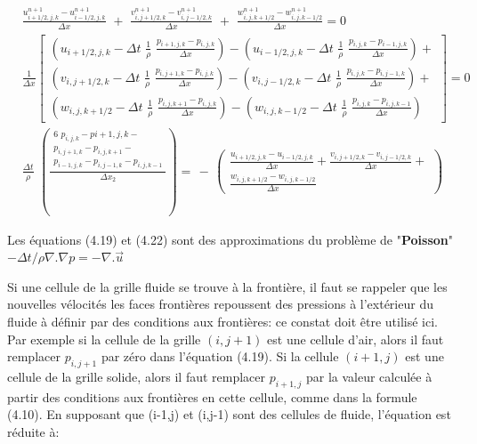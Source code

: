 \documentclass[11pt]{report}
\begin{document}
\begin{eqnarray}
& \frac{u_{i+1/2,j,k}^{n+1} - u_{i-1/2,j,k}^{n+1}}{\Delta x} \,\,+\,\, \frac{v_{i,j+1/2,k}^{n+1} - v_{i,j-1/2,k}^{n+1}}{\Delta x} \,\,+\,\,
\frac{w_{i,j,k+1/2}^{n+1} - w_{i,j,k-1/2}^{n+1}}{\Delta x} =  0 \\ 
& \frac{1}{\Delta x} 
	\left[
		\begin{array}{c}
			\left( 
			u_{i+1/2,j,k} - \Delta t \,\, \frac{1}{\rho} \,\, \frac{p_{i+1,j,k} - p_{i,j,k}}{\Delta x}
			\right) -
			\left( 
			u_{i-1/2,j,k} - \Delta t \,\, \frac{1}{\rho} \,\, \frac{p_{i,j,k} - p_{i-1,j,k}}{\Delta x}
			\right) +\\
			\left( 
			v_{i,j+1/2,k} - \Delta t \,\, \frac{1}{\rho} \,\, \frac{p_{i,j+1,k} - p_{i,j,k}}{\Delta x}
			\right) -
			\left( 
			v_{i,j-1/2,k} - \Delta t \,\, \frac{1}{\rho} \,\, \frac{p_{i,j,k} - p_{i,j-1,k}}{\Delta x}
			\right)+\\
			\left( 
			w_{i,j,k+1/2} - \Delta t \,\, \frac{1}{\rho} \,\, \frac{p_{i,j,k+1} - p_{i,j,k}}{\Delta x}
			\right) -
			\left( 
			w_{i,j,k-1/2} - \Delta t \,\, \frac{1}{\rho} \,\, \frac{p_{i,j,k} - p_{i,j,k-1}}{\Delta x}
			\right)
		\end{array}
	 \right] =  0 \\	 
& \frac{\Delta t}{\rho} \,\,
\left(	
	\frac{
		\begin{array}{c}
			6 \,\, p_{i,j,k} - p{i+1,j,k} -\\
			p_{i,j+1,k} - p_{i,j,k+1} - \\ 
			p_{i-1,j,k} - p_{i,j-1,k} - p_{i,j,k-1}
		\end{array}
	}
	{\Delta x_2}
\right) = \, - \,	 
\left(
	\begin{array}{c}
		\frac{u_{i+1/2,j,k} - u_{i-1/2,j,k}}{\Delta x} + 
		\frac{v_{i,j+1/2,k} - v_{i,j-1/2,k}}{\Delta x} + \\
		\frac{w_{i,j,k+1/2} - w_{i,j,k-1/2}}{\Delta x}
	\end{array}
\right)
\end{eqnarray}

Les équations (4.19) et (4.22) sont des approximations du problème de "\textbf{Poisson}" $ - \Delta t/\rho \nabla . \nabla p = - \nabla . \overrightarrow{u} $


Si une cellule de la grille fluide se trouve à la frontière, il faut se rappeler que les nouvelles vélocités les faces frontières repoussent des pressions à l'extérieur du fluide à définir par des conditions aux frontières: ce constat doit être utilisé ici. Par exemple si la cellule de la grille $(i, j+1)$ est une cellule d'air, alors il faut remplacer $p_{i,j+1}$ par zéro dans l'équation (4.19). Si la cellule $(i+1,j)$ est une cellule de la grille solide, alors il faut remplacer $p_{i+1,j}$ par la valeur calculée à partir des conditions aux frontières en cette cellule, comme dans la formule (4.10). En supposant que (i-1,j) et (i,j-1) sont des cellules de fluide, l'équation est réduite à:
\end{document}
